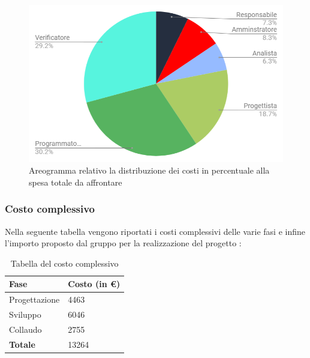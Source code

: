 \begin{figure}[h!]
	\caption{Areogramma relativo la distribuzione dei costi in percentuale alla spesa totale da affrontare}
    \includegraphics[width=1\textwidth]{./src/Preventivo/src/img/TortaPrevCompleto.png}  
\end{figure}

\subsubsection{Costo complessivo}
Nella seguente tabella vengono riportati i costi complessivi delle varie fasi e infine l'importo proposto dal gruppo \Gruppo{} per la realizzazione del progetto \NomeProgetto{}:\\
{
\renewcommand{\arraystretch}{2}
\begin{longtable}{ C{5cm} C{5cm}}
\caption{Tabella del costo complessivo}\\
\rowcolor{\primaryColor}

\textcolor{\secondaryColor}{\textbf{Fase}} &
\textcolor{\secondaryColor}{\textbf{Costo  (in \euro{})}}\\	
\endhead

Progettazione  &  4463 \\
Sviluppo & 6046  \\
Collaudo &  2755 \\
\textbf{Totale}  &  13264 \\

\end{longtable}
}